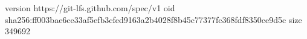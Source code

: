 version https://git-lfs.github.com/spec/v1
oid sha256:ff003bae6ce33af5efb3cfed9163a2b4028f8b45c77377fc368fdf8350ce9d5c
size 349692
